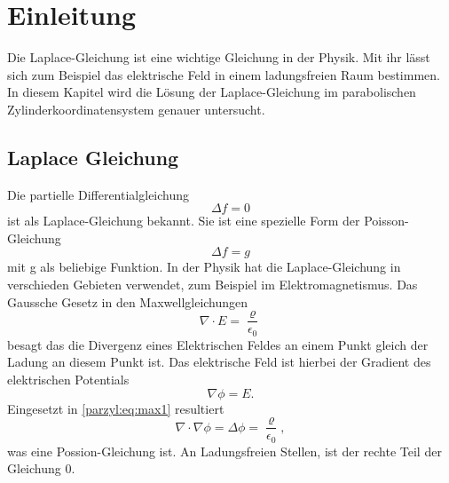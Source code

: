 %
%
%
\section{Einleitung\label{parzyl:section:teil0}}
Die Laplace-Gleichung ist eine wichtige Gleichung in der Physik.
Mit ihr lässt sich zum Beispiel das elektrische Feld in einem ladungsfreien Raum bestimmen.
In diesem Kapitel wird die Lösung der Laplace-Gleichung im 
parabolischen Zylinderkoordinatensystem genauer untersucht.
\subsection{Laplace Gleichung}
Die partielle Differentialgleichung
\begin{equation}
    \Delta f = 0
\end{equation}
ist als Laplace-Gleichung bekannt.
Sie ist eine spezielle Form der Poisson-Gleichung
\begin{equation}
    \Delta f = g
\end{equation}
mit g als beliebige Funktion.
In der Physik hat die Laplace-Gleichung in verschieden Gebieten
verwendet, zum Beispiel im Elektromagnetismus.
Das Gaussche Gesetz in den Maxwellgleichungen 
\begin{equation}
     \nabla \cdot E = \frac{\varrho}{\epsilon_0}
\label{parzyl:eq:max1}
\end{equation}
besagt das die Divergenz eines Elektrischen Feldes an einem 
Punkt gleich der Ladung an diesem Punkt ist.
Das elektrische Feld ist hierbei der Gradient des elektrischen
Potentials
\begin{equation}
    \nabla \phi = E.
\end{equation}
Eingesetzt in \eqref{parzyl:eq:max1} resultiert
\begin{equation}
    \nabla \cdot \nabla \phi = \Delta \phi = \frac{\varrho}{\epsilon_0},
\end{equation}
was eine Possion-Gleichung ist.
An Ladungsfreien Stellen, ist der rechte Teil der Gleichung $0$. 
